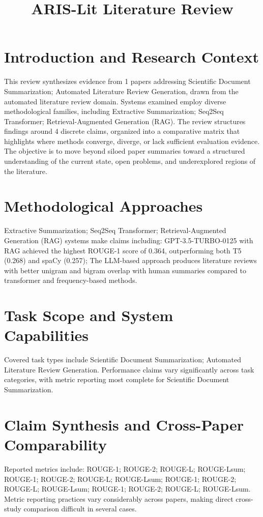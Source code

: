 \documentclass{article}
\title{ARIS-Lit Literature Review}
\begin{document}
\maketitle
\section{Introduction and Research Context}
This review synthesizes evidence from 1 papers addressing Scientific Document Summarization; Automated Literature Review Generation, drawn from the automated literature review domain. Systems examined employ diverse methodological families, including Extractive Summarization; Seq2Seq Transformer; Retrieval-Augmented Generation (RAG). The review structures findings around 4 discrete claims, organized into a comparative matrix that highlights where methods converge, diverge, or lack sufficient evaluation evidence. The objective is to move beyond siloed paper summaries toward a structured understanding of the current state, open problems, and underexplored regions of the literature.

\section{Methodological Approaches}
Extractive Summarization; Seq2Seq Transformer; Retrieval-Augmented Generation (RAG) systems make claims including: GPT-3.5-TURBO-0125 with RAG achieved the highest ROUGE-1 score of 0.364, outperforming both T5 (0.268) and spaCy (0.257); The LLM-based approach produces literature reviews with better unigram and bigram overlap with human summaries compared to transformer and frequency-based methods.

\section{Task Scope and System Capabilities}
Covered task types include Scientific Document Summarization; Automated Literature Review Generation. Performance claims vary significantly across task categories, with metric reporting most complete for Scientific Document Summarization.

\section{Claim Synthesis and Cross-Paper Comparability}
Reported metrics include: ROUGE-1; ROUGE-2; ROUGE-L; ROUGE-Lsum; ROUGE-1; ROUGE-2; ROUGE-L; ROUGE-Lsum; ROUGE-1; ROUGE-2; ROUGE-L; ROUGE-Lsum; ROUGE-1; ROUGE-2; ROUGE-L; ROUGE-Lsum. Metric reporting practices vary considerably across papers, making direct cross-study comparison difficult in several cases.
\end{document}
